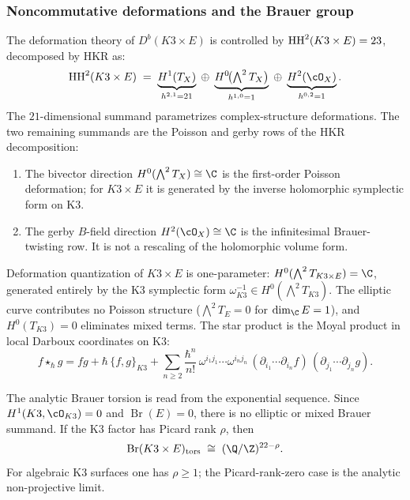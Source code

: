 \subsubsection{Noncommutative deformations and the Brauer group}
\label{subsubsec:k3e-nc-deformations}

The deformation theory of $D^b(K3 \times E)$ is controlled by
$\operatorname{HH}^2(K3 \times E) = 23$, decomposed by HKR as:
\begin{equation}\label{eq:k3e-hh2-decomposition}
\HH^2(K3 \times E)
\;=\;
\underbrace{H^1(T_X)}_{h^{2,1} = 21}
\;\oplus\;
\underbrace{H^0\!\bigl(\textstyle\bigwedge^2 T_X\bigr)}_{h^{1,0} = 1}
\;\oplus\;
\underbrace{H^2(\cO_X)}_{h^{0,2} = 1}.
\end{equation}
The $21$-dimensional summand parametrizes complex-structure
deformations. The two remaining summands are the Poisson and gerby
rows of the HKR decomposition:
\begin{enumerate}[label=\textup{(\roman*)}]
\item The bivector direction $H^0(\bigwedge^2 T_X) \cong \C$
 is the first-order Poisson deformation; for $K3\times E$ it is
 generated by the inverse holomorphic symplectic form on K3.
\item The gerby $B$-field direction $H^2(\cO_X) \cong \C$ is the
 infinitesimal Brauer-twisting row. It is not a rescaling of the
 holomorphic volume form.
\end{enumerate}

Deformation quantization of $K3 \times E$ is one-parameter:
$H^0(\bigwedge^2 T_{K3 \times E}) = \C$, generated entirely by the
K3 symplectic form $\omega_{K3}^{-1} \in H^0(\bigwedge^2 T_{K3})$.
The elliptic curve contributes no Poisson structure
($\bigwedge^2 T_E = 0$ for $\dim_\C E = 1$), and $H^0(T_{K3}) = 0$
eliminates mixed terms. The star product is the Moyal product
in local Darboux coordinates on K3:
\begin{equation}\label{eq:k3e-star-product}
f \star_\hbar g
= f g + \hbar\,\{f, g\}_{K3}
+ \sum_{n \geq 2} \frac{\hbar^n}{n!}\,
\omega^{i_1 j_1} \cdots \omega^{i_n j_n}\,
(\partial_{i_1} \cdots \partial_{i_n} f)\,
(\partial_{j_1} \cdots \partial_{j_n} g).
\end{equation}

The analytic Brauer torsion is read from the exponential sequence. Since
$H^1(K3,\cO_{K3})=0$ and $\operatorname{Br}(E)=0$, there is no elliptic
or mixed Brauer summand. If the K3 factor has Picard rank $\rho$, then
\begin{equation}\label{eq:k3e-brauer}
\operatorname{Br}(K3 \times E)_{\mathrm{tors}}
\;\cong\;
(\Q/\Z)^{22-\rho}.
\end{equation}
For algebraic K3 surfaces one has $\rho\geq 1$; the Picard-rank-zero
case is the analytic non-projective limit.

